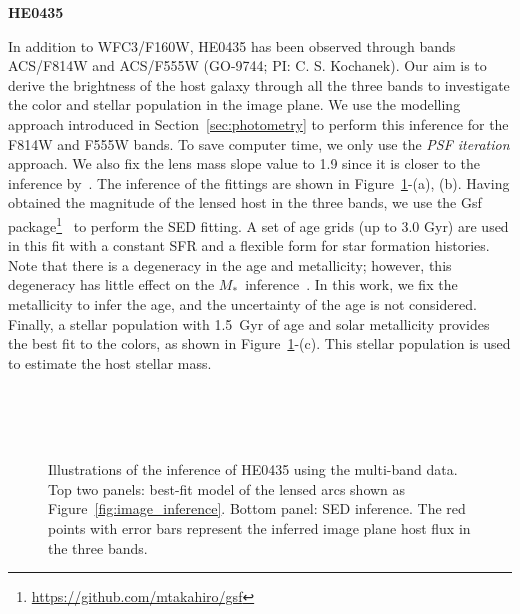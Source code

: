 \documentclass[fleqn,usenatbib]{mnras}
\newcommand{\hst}{{\it HST}}
\newcommand{\mstar}{{$M_*$}}
\begin{document}
{\bf HE0435} ~ {\color{blue}
In addition to WFC3/F160W, HE0435 has been observed through bands ACS/F814W and ACS/F555W (GO-9744; PI: C. S. Kochanek). Our aim is to derive the brightness of the host galaxy through all the three bands to investigate the color and stellar population in the image plane. We use the modelling approach introduced in Section~\ref{sec:photometry} to perform this inference for the F814W and F555W bands. To save computer time, we only use the {\it PSF iteration} approach. We also fix the lens mass slope value to 1.9 since it is closer to the inference by~\citet[][i.e., $\gamma\sim1.93$]{Wong2017}. The inference of the fittings are shown in Figure~\ref{fig:app_HE0435}-(a), (b). Having obtained the magnitude of the lensed host in the three bands, we use the {\sc Gsf} package\footnote{\url{https://github.com/mtakahiro/gsf}}~\citep{Morishita2019} to perform the SED fitting. A set of age grids (up to 3.0 Gyr) are used in this fit with a constant SFR and a flexible form for star formation histories. Note that there is a degeneracy in the age and metallicity; however, this degeneracy has little effect on the \mstar\ inference~\citep{Bell2001}. In this work, we fix the metallicity to infer the age, and the uncertainty of the age is not considered. Finally, a stellar population with 1.5~Gyr of age and solar metallicity provides the best fit to the colors, as shown in Figure~\ref{fig:app_HE0435}-(c). This stellar population is used to estimate the host stellar mass.

\begin{figure}
\centering
{}\\
\\
\\
\caption{\label{fig:app_HE0435} 
Illustrations of the inference of HE0435 using the multi-band data. Top two panels: best-fit model of the lensed arcs shown as Figure~\ref{fig:image_inference}. Bottom panel: SED inference. The red points with error bars represent the inferred image plane host flux in the three bands.}
\end{figure} 
}
\end{document}
